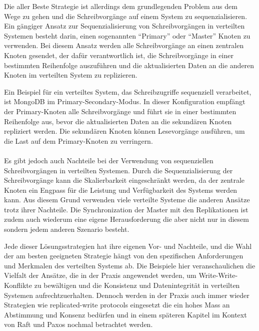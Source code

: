 Die aller Beste Strategie ist allerdings dem grundlegenden Problem aus dem Wege zu gehen und die Schreibvorgänge auf einem System zu sequenzialisieren. Ein gängiger Ansatz zur Sequenzialisierung von Schreibvorgängen in verteilten Systemen besteht darin, einen sogenannten \enquote{Primary} oder \enquote{Master} Knoten zu verwenden. Bei diesem Ansatz werden alle Schreibvorgänge an einen zentralen Knoten gesendet, der dafür verantwortlich ist, die Schreibvorgänge in einer bestimmten Reihenfolge auszuführen und die aktualisierten Daten an die anderen Knoten im verteilten System zu replizieren.

Ein Beispiel für ein verteiltes System, das Schreibzugriffe sequenziell verarbeitet, ist MongoDB im Primary-Secondary-Modus. In dieser Konfiguration empfängt der Primary-Knoten alle Schreibvorgänge und führt sie in einer bestimmten Reihenfolge aus, bevor die aktualisierten Daten an die sekundären Knoten repliziert werden. Die sekundären Knoten können Lesevorgänge ausführen, um die Last auf dem Primary-Knoten zu verringern.
\\\\
Es gibt jedoch auch Nachteile bei der Verwendung von sequenziellen Schreibvorgängen in verteilten Systemen. Durch die Sequenzialisierung der Schreibvorgänge kann die Skalierbarkeit eingeschränkt werden, da der zentrale Knoten ein Engpass für die Leistung und Verfügbarkeit des Systems werden kann. Aus diesem Grund verwenden viele verteilte Systeme die anderen Ansätze trotz ihrer Nachteile. Die Synchronization der Master mit den Replikationen ist zudem auch wiederum eine eigene Herausforderung die aber nicht nur in diesem sondern jedem anderen Szenario besteht.  

Jede dieser Lösungsstrategien hat ihre eigenen Vor- und Nachteile, und die Wahl der am besten geeigneten Strategie hängt von den spezifischen Anforderungen und Merkmalen des verteilten Systems ab. Die Beispiele hier veranschaulichen die Vielfalt der Ansätze, die in der Praxis angewendet werden, um Write-Write-Konflikte zu bewältigen und die Konsistenz und Datenintegrität in verteilten Systemen aufrechtzuerhalten. Dennoch werden in der Praxis auch immer wieder Strategien wie replicated-write protocols eingesetzt die ein hohes Mass an Abstimmung und Konsenz bedürfen und in einem späteren Kapitel im Kontext von Raft und Paxos nochmal betrachtet werden.  



	




